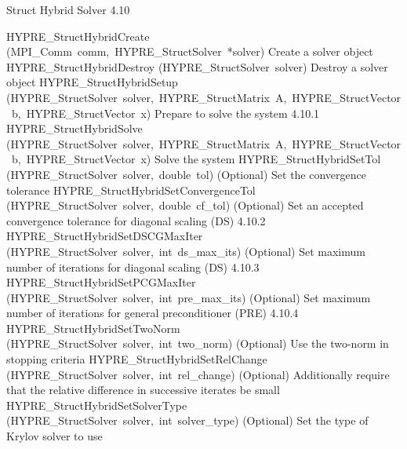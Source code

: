 \documentclass{article}
\begin{document}
\begin{cxxentry}
\begin{cxxentry}
\begin{cxxfunction}
\begin{cxxdoc}
\end{cxxdoc}
\end{cxxfunction}
\end{cxxentry}
\begin{cxxentry}
{}
        {Struct Hybrid Solver}
        {}
        {
}
        {4.10}
\begin{cxxnames}
        {HYPRE\_StructHybridCreate}
        {(MPI\_Comm\ comm,\ HYPRE\_StructSolver\ *solver)}
        {
Create a solver object}
        {}
\label{cxx.4.10.6}
        {HYPRE\_StructHybridDestroy}
        {(HYPRE\_StructSolver\ solver)}
        {
Destroy a solver object}
        {}
\label{cxx.4.10.7}
        {HYPRE\_StructHybridSetup}
        {(HYPRE\_StructSolver\ solver,\ HYPRE\_StructMatrix\ A,\ HYPRE\_StructVector\ b,\ HYPRE\_StructVector\ x)}
        {
Prepare to solve the system}
        {4.10.1}
        {HYPRE\_StructHybridSolve}
        {(HYPRE\_StructSolver\ solver,\ HYPRE\_StructMatrix\ A,\ HYPRE\_StructVector\ b,\ HYPRE\_StructVector\ x)}
        {
Solve the system}
        {}
\label{cxx.4.10.8}
        {HYPRE\_StructHybridSetTol}
        {(HYPRE\_StructSolver\ solver,\ double\ tol)}
        {
(Optional) Set the convergence tolerance}
        {}
\label{cxx.4.10.9}
        {HYPRE\_StructHybridSetConvergenceTol}
        {(HYPRE\_StructSolver\ solver,\ double\ cf\_tol)}
        {
(Optional) Set an accepted convergence tolerance for diagonal scaling (DS)}
        {4.10.2}
        {HYPRE\_StructHybridSetDSCGMaxIter}
        {(HYPRE\_StructSolver\ solver,\ int\ ds\_max\_its)}
        {
(Optional) Set maximum number of iterations for diagonal scaling (DS)}
        {4.10.3}
        {HYPRE\_StructHybridSetPCGMaxIter}
        {(HYPRE\_StructSolver\ solver,\ int\ pre\_max\_its)}
        {
(Optional) Set maximum number of iterations for general preconditioner (PRE)}
        {4.10.4}
        {HYPRE\_StructHybridSetTwoNorm}
        {(HYPRE\_StructSolver\ solver,\ int\ two\_norm)}
        {
(Optional) Use the two-norm in stopping criteria}
        {}
\label{cxx.4.10.10}
        {HYPRE\_StructHybridSetRelChange}
        {(HYPRE\_StructSolver\ solver,\ int\ rel\_change)}
        {
(Optional) Additionally require that the relative difference in
successive iterates be small}
        {}
\label{cxx.4.10.11}
        {HYPRE\_StructHybridSetSolverType}
        {(HYPRE\_StructSolver\ solver,\ int\ solver\_type)}
        {
(Optional) Set the type of Krylov solver to use}

\end{cxxnames}
\end{cxxentry}
\end{cxxentry}
\end{document}
